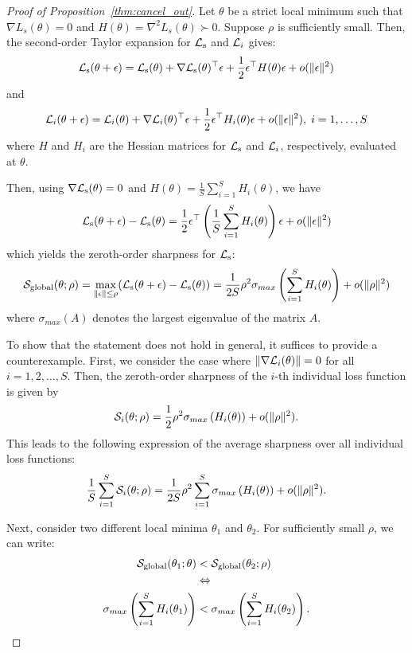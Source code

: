 \documentclass{article}
\theoremstyle{plain}
\theoremstyle{definition}
\theoremstyle{remark}
\begin{document}
\begin{proof}[Proof of Proposition~\ref{thm:cancel_out}]
Let $\theta$ be a strict local minimum such that $\nabla L_s (\theta)=0$ and $H(\theta)=\nabla^2 L_s(\theta) \succ 0$. Suppose $\rho$ is sufficiently small. Then, the second-order Taylor expansion for ${\mathcal{L}}_{\text{s}}$ and ${\mathcal{L}}_{i}$ gives:
\[{\mathcal{L}}_{\text{s}}(\theta+\epsilon) = {\mathcal{L}}_{\text{s}}(\theta) + \nabla {\mathcal{L}}_{\text{s}}(\theta)^\top\epsilon+\frac{1}{2}\epsilon^\top H(\theta)\epsilon + o(\|\epsilon\|^2) \]
and
\[{\mathcal{L}}_{i}(\theta+\epsilon) = {\mathcal{L}}_{i}(\theta) + \nabla {\mathcal{L}}_{i}(\theta)^\top\epsilon+\frac{1}{2}\epsilon^\top H_i(\theta)\epsilon + o(\|\epsilon\|^2),\; i=1,\dots,S \]
where $H$ and $H_i$ are the Hessian matrices for ${\mathcal{L}}_{\text{s}}$ and ${\mathcal{L}}_{i}$, respectively, evaluated at $\theta$. 

Then, using $\nabla {\mathcal{L}}_{\text{s}}(\theta)=0$ and $H(\theta)=\frac{1}{S}\sum_{i=1}^S H_i(\theta)$, we have 
\[{\mathcal{L}}_{\text{s}}(\theta+\epsilon) - {\mathcal{L}}_{\text{s}}(\theta) = \frac{1}{2}\epsilon^\top \left(\frac{1}{S}\sum_{i=1}^S H_i(\theta)\right)\epsilon + o(\|\epsilon\|^2)\]
which yields the zeroth-order sharpness for ${\mathcal{L}}_{\text{s}}$:
$$
{\mathcal{S}}_{\text{global}}(\theta;\rho) = \max_{\|\epsilon\| \leq \rho }({\mathcal{L}}_{\text{s}}(\theta+\epsilon)-{\mathcal{L}}_{\text{s}}(\theta)) = \frac{1}{2S}\rho^2\sigma_{max}\left(\sum_{i=1}^S H_i(\theta)\right) + o(\|\rho\|^2)
$$
where $\sigma_{max}(A)$ denotes the largest eigenvalue of the matrix $A$. 



To show that the statement does not hold in general, it suffices to provide a counterexample. First, we consider the case where $\|\nabla {\mathcal{L}}_{i}(\theta)\| = 0$ for all $i=1,2,\ldots, S$. Then, the zeroth-order sharpness of the $i$-th individual loss function is given by 
$$
{\mathcal{S}}_i(\theta;\rho) = \frac{1}{2}\rho^2\sigma_{max}\left(H_i(\theta)\right) + o(\|\rho\|^2).
$$
This leads to the following expression of the average sharpness over all individual loss functions:
$$
\frac{1}{S}\sum_{i=1}^S {\mathcal{S}}_i(\theta;\rho) = \frac{1}{2S}\rho^2\sum_{i=1}^S \sigma_{max}\left(H_i(\theta)\right) + o(\|\rho\|^2).
$$

Next, consider two different local minima $\theta_1$ and $\theta_2$. For sufficiently small $\rho$, we can write:
\begin{align}
{\mathcal{S}}_{\text{global}}(\theta_1;\theta) &< {\mathcal{S}}_{\text{global}}(\theta_2;\rho) \label{ineq:sp_total}\\
&\Leftrightarrow \nonumber \\ \sigma_{max}\left(\sum_{i=1}^S H_i(\theta_1)\right) &< \sigma_{max}\left(\sum_{i=1}^S H_i(\theta_2)\right). \label{ineq:sp_total1}
\end{align}


\end{proof}
\end{document}
